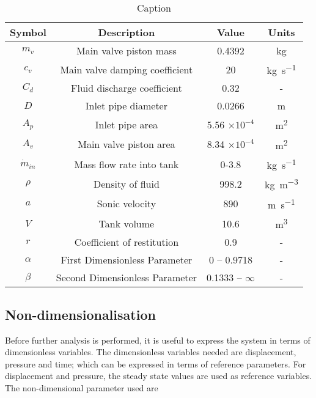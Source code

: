\begin{table}[ht]
    \centering
    \begin{tabular}{c|c|c|c}
        Symbol & Description & Value & Units \\ \hline \hline
        $m_v$ & Main valve piston mass & 0.4392 & \si{kg} \\ \hline %
        $c_v$ & Main valve damping coefficient & 20 & \si{kg.s^{-1}} \\ \hline %
        $C_d$ & Fluid discharge coefficient & 0.32 & - \\ \hline %
        $D$ & Inlet pipe diameter & 0.0266 & \si{m} \\ \hline %
        $A_p$ & Inlet pipe area & 5.56 $\times 10^{-4}$ & \si{m^2} \\ \hline
        $A_v$ & Main valve piston area & 8.34 $\times 10^{-4}$ & \si{m^2} \\ \hline
        $\dot{m}_{in}$ & Mass flow rate into tank & 0-3.8 & \si{kg.s^{-1}} \\ \hline %
        $\rho$ & Density of fluid & 998.2 & \si{kg.m^{-3}} \\ \hline %
        $a$ & Sonic velocity & 890 & \si{m.s^{-1}} \\ \hline %
        $V$ & Tank volume & 10.6 & \si{m^3} \\ \hline %
        $r$ & Coefficient of restitution & 0.9 & - \\ \hline \hline %
        $\alpha$ & First Dimensionless Parameter & 0 -- 0.9718 & - \\ \hline
        $\beta$ & Second Dimensionless Parameter & 0.1333 -- $\infty$ & - \\ %
    \end{tabular}
    \caption{Caption}
    \label{tab:my_label}
\end{table}

\subsection{Non-dimensionalisation}

Before further analysis is performed, it is useful to express the system in terms of dimensionless variables. The dimensionless variables needed are displacement, pressure and time; which can be expressed in terms of reference parameters. For displacement and pressure, the steady state values are used as reference variables. The non-dimensional parameter used are

